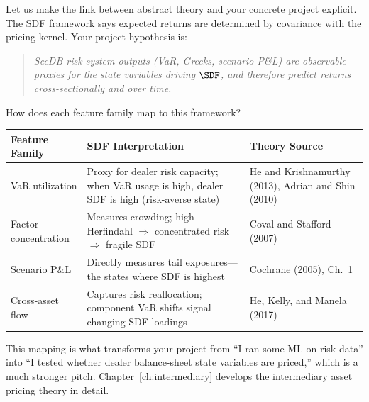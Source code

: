 Let us make the link between abstract theory and your concrete project explicit. The SDF framework says expected returns are determined by covariance with the pricing kernel. Your project hypothesis is:

\begin{quote}
\emph{SecDB risk-system outputs (VaR, Greeks, scenario P\&L) are observable proxies for the state variables driving $\SDF$, and therefore predict returns cross-sectionally and over time.}
\end{quote}

How does each feature family map to this framework?

\begin{center}
\begin{tabular}{p{3.5cm} p{4.5cm} p{5cm}}
\toprule
\textbf{Feature Family} & \textbf{SDF Interpretation} & \textbf{Theory Source} \\
\midrule
VaR utilization & Proxy for dealer risk capacity; when VaR usage is high, dealer SDF is high (risk-averse state) & He and Krishnamurthy (2013), Adrian and Shin (2010) \\
Factor concentration & Measures crowding; high Herfindahl $\Rightarrow$ concentrated risk $\Rightarrow$ fragile SDF & Coval and Stafford (2007) \\
Scenario P\&L & Directly measures tail exposures---the states where SDF is highest & Cochrane (2005), Ch.~1 \\
Cross-asset flow & Captures risk reallocation; component VaR shifts signal changing SDF loadings & He, Kelly, and Manela (2017) \\
\bottomrule
\end{tabular}
\end{center}

This mapping is what transforms your project from ``I ran some ML on risk data'' into ``I tested whether dealer balance-sheet state variables are priced,'' which is a much stronger pitch. Chapter~\ref{ch:intermediary} develops the intermediary asset pricing theory in detail.

